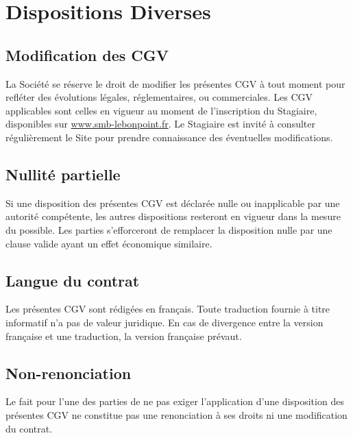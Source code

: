 \documentclass[a4paper,12pt]{article}
\begin{document}
\section{Dispositions Diverses}
\subsection{Modification des CGV}
La Société se réserve le droit de modifier les présentes CGV à tout moment pour refléter des évolutions légales, réglementaires, ou commerciales. Les CGV applicables sont celles en vigueur au moment de l'inscription du Stagiaire, disponibles sur \href{https://www.smb-lebonpoint.fr}{www.smb-lebonpoint.fr}. Le Stagiaire est invité à consulter régulièrement le Site pour prendre connaissance des éventuelles modifications.

\subsection{Nullité partielle}
Si une disposition des présentes CGV est déclarée nulle ou inapplicable par une autorité compétente, les autres dispositions resteront en vigueur dans la mesure du possible. Les parties s'efforceront de remplacer la disposition nulle par une clause valide ayant un effet économique similaire.

\subsection{Langue du contrat}
Les présentes CGV sont rédigées en français. Toute traduction fournie à titre informatif n'a pas de valeur juridique. En cas de divergence entre la version française et une traduction, la version française prévaut.

\subsection{Non-renonciation}
Le fait pour l'une des parties de ne pas exiger l'application d'une disposition des présentes CGV ne constitue pas une renonciation à ses droits ni une modification du contrat.

\vspace{15cm} %
\end{document}
